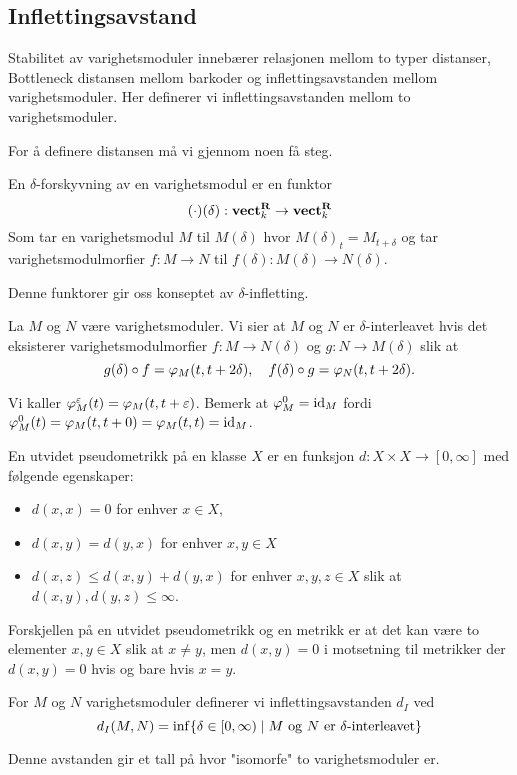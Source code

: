 \subsection{Inflettingsavstand}
Stabilitet av varighetsmoduler innebærer relasjonen mellom to typer distanser, Bottleneck distansen mellom barkoder
og inflettingsavstanden mellom varighetsmoduler. Her definerer vi inflettingsavstanden mellom to varighetsmoduler.

For å definere distansen må vi gjennom noen få steg.
\begin{definisjon}\label{Def:DShift}
	En $\delta$-forskyvning av en varighetsmodul er en funktor
	\[(\cdot)(\delta): \textnormal{\textbf{vect}}_k^{\textnormal{\textbf{R}}}\to \textnormal{\textbf{vect}}_k^{\textnormal{\textbf{R}}}\]
	Som tar en varighetsmodul $M$ til $M(\delta)$ hvor $M(\delta)_t = M_{t+\delta}$ og tar varighetsmodulmorfier $f:M\to N$ til $f(\delta):M(\delta)\to N(\delta)$.
\end{definisjon}

Denne funktorer gir oss konseptet av $\delta$-infletting.

\begin{definisjon}\label{Def:infletting}
	La $M$ og $N$ være varighetsmoduler. Vi sier at $M$ og $N$ er $\delta$-interleavet hvis det eksisterer varighetsmodulmorfier $f:M\to N(\delta)$ og $g:N\to M(\delta)$ slik at
	\[g(\delta)\circ f = \varphi_M(t,t+2\delta),\quad f(\delta)\circ g = \varphi_N(t,t+2\delta).\]
\end{definisjon}
Vi kaller $\varphi^\varepsilon_M(t) = \varphi_M(t,t+\varepsilon)$. Bemerk at $\varphi^0_M=\textnormal{id}_M$ fordi $\varphi^0_M(t) = \varphi_M(t,t+0)=\varphi_M(t,t)=\textnormal{id}_M$.

\begin{definisjon}\label{def:UtPsMet}
   En utvidet pseudometrikk på en klasse $X$ er en
   funksjon $d: X\times X\to [0,\infty]$ med følgende
   egenskaper:
   \begin{itemize}
     \item $d(x,x) = 0$ for enhver $x\in X$,
     \item $d(x,y) = d(y,x)$ for enhver $x,y\in X$
     \item $d(x,z) \leq d(x,y) + d(y,x)$ for enhver
       $x,y,z\in X$ slik at $d(x,y),d(y,z)\leq\infty$.
   \end{itemize}
\end{definisjon}

Forskjellen på en utvidet pseudometrikk og en metrikk er
at det kan være to elementer $x,y\in X$ slik at $x\neq y$,
men $d(x,y)=0$ i motsetning til metrikker der $d(x,y)=0$
hvis og bare hvis $x=y$.

\begin{definisjon}\label{Def:InfAvs}
	For $M$ og $N$ varighetsmoduler definerer vi inflettingsavstanden $d_I$ ved
	\[d_I(M,N) = \inf\{\delta\in [0,\infty)\mid \text{$M$ og $N$ er $\delta$-interleavet}\}\]
\end{definisjon}
Denne avstanden gir et tall på hvor "isomorfe" to varighetsmoduler er.

